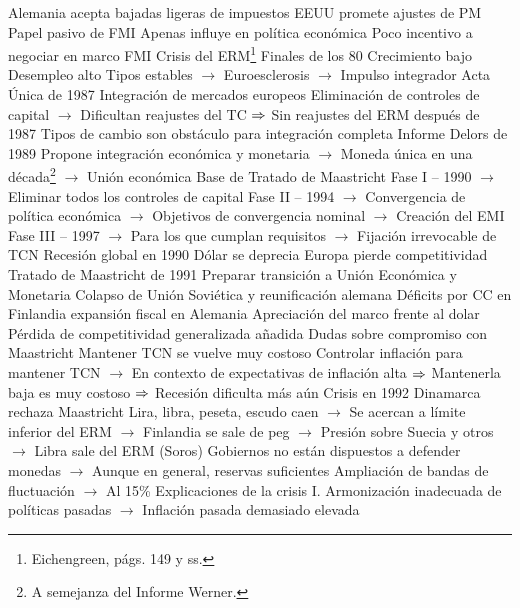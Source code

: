 \documentclass{nuevotema}
\begin{document}
\begin{esquemal}
				\4 Alemania acepta bajadas ligeras de impuestos
				\4 EEUU promete ajustes de PM
				\4 Papel pasivo de FMI
				\4[] Apenas influye en política económica
				\4[] Poco incentivo a negociar en marco FMI
			\3 Crisis del ERM\footnote{Eichengreen, págs. 149 y ss.}
				\4 Finales de los 80
				\4[] Crecimiento bajo
				\4[] Desempleo alto
				\4[] Tipos estables
				\4[] $\to$ Euroesclerosis
				\4[] $\to$ Impulso integrador
				\4 Acta Única de 1987
				\4[] Integración de mercados europeos
				\4[] Eliminación de controles de capital
				\4[] $\to$ Dificultan reajustes del TC
				\4[] $\Rightarrow$ Sin reajustes del ERM después de 1987
				\4[] Tipos de cambio son obstáculo para integración completa
				\4 Informe Delors de 1989
				\4[] Propone integración económica y monetaria
				\4[] $\to$ Moneda única en una década\footnote{A semejanza del Informe Werner.}
				\4[] $\to$ Unión económica
				\4[] Base de Tratado de Maastricht
				\4[] Fase I -- 1990
				\4[] $\to$ Eliminar todos los controles de capital
				\4[] Fase II -- 1994
				\4[] $\to$ Convergencia de política económica
				\4[] $\to$ Objetivos de convergencia nominal
				\4[] $\to$ Creación del EMI
				\4[] Fase III -- 1997
				\4[] $\to$ Para los que cumplan requisitos
				\4[] $\to$ Fijación irrevocable de TCN
				\4 Recesión global en 1990
				\4[] Dólar se deprecia
				\4[] Europa pierde competitividad
				\4 Tratado de Maastricht de 1991
				\4[] Preparar transición a Unión Económica y Monetaria
				\4 Colapso de Unión Soviética y reunificación alemana
				\4[] Déficits por CC en Finlandia
				\4[] expansión fiscal en Alemania
				\4[] Apreciación del marco frente al dolar
				\4[] Pérdida de competitividad generalizada añadida
				\4 Dudas sobre compromiso con Maastricht
				\4[] Mantener TCN se vuelve muy costoso
				\4[] Controlar inflación para mantener TCN
				\4[] $\to$ En contexto de expectativas de inflación alta
				\4[] $\Rightarrow$ Mantenerla baja es muy costoso
				\4[] $\Rightarrow$ Recesión dificulta más aún
				\4 Crisis en 1992
				\4[] Dinamarca rechaza Maastricht
				\4[] Lira, libra, peseta, escudo caen
				\4[] $\to$ Se acercan a límite inferior del ERM
				\4[] $\to$ Finlandia se sale de peg
				\4[] $\to$ Presión sobre Suecia y otros
				\4[] $\to$ Libra sale del ERM (Soros)
				\4[] Gobiernos no están dispuestos a defender monedas
				\4[] $\to$ Aunque en general, reservas suficientes
				\4[] Ampliación de bandas de fluctuación
				\4[] $\to$ Al 15\%
				\4 Explicaciones de la crisis
				\4[] I. Armonización inadecuada de políticas pasadas
				\4[] $\to$ Inflación pasada demasiado elevada

\end{esquemal}
\end{document}
